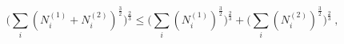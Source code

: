 \begin{equation}
\biggl(\sum_i(N_i^{(1)}+N_i^{(2)})^{\frac{3}{2}}\biggr)^{\frac{2}{3}}
\leq
\biggl(\sum_i(N_i^{(1)})^{\frac{3}{2}}\biggr)^{\frac{2}{3}}
+\biggl(\sum_i(N_i^{(2)})^{\frac{3}{2}}\biggr)^{\frac{2}{3}}~,
\label{minkowski.eqn2}
\end{equation}

